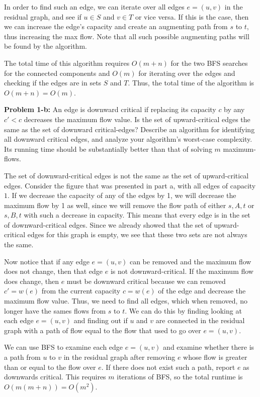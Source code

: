 \documentclass[psamsfonts]{amsart}
\newenvironment{sol}{\vspace{0.25cm}{\large \bfseries Solution:}}{\qedsymbol}
\newenvironment{prob}[1]{\begin{framed}{\large \bfseries Problem #1:}}{\end{framed}}
\begin{document}
\begin{sol}
In order to find such an edge, we can iterate over all edges $e = (u,v)$ in the residual graph, and see if $u \in S$ and $v \in T$ or vice versa. If this is the case, then we can increase the edge's capacity and create an augmenting path from $s$ to $t$, thus increasing the max flow. Note that all such possible augmenting paths will be found by the algorithm.

The total time of this algorithm requires $O(m+n)$ for the two BFS searches for the connected components and $O(m)$ for iterating over the edges and checking if the edges are in sets $S$ and $T$. Thus, the total time of the algorithm is $O(m+n) = O(m)$.
\end{sol}

\begin{prob}{1-b}
An edge is downward critical if replacing its capacity $c$ by any $c' < c$ decreases the maximum flow value. Is the set of upward-critical edges the same as the set of downward critical-edges? Describe an algorithm for identifying all downward critical edges, and analyze your algorithm's worst-case complexity. Its running time should be substantially better than that of solving $m$ maximum-flows.
\end{prob}
\begin{sol}
The set of downward-critical edges is not the same as the set of upward-critical edges. Consider the figure that was presented in part a, with all edges of capacity $1$. If we decrease the capacity of any of the edges by 1, we will decrease the maximum flow by 1 as well, since we will remove the flow path of either $s, A, t$ or $s,B,t$ with such a decrease in capacity. This means that every edge is in the set of downward-critical edges. Since we already showed that the set of upward-critical edges for this graph is empty, we see that these two sets are not always the same.

Now notice that if any edge $e = (u,v)$ can be removed and the maximum flow does not change, then that edge $e$ is not downward-critical. If the maximum flow does change, then $e$ must be downward critical because we can removed $c' = w(e)$ from the current capacity $c = w(e)$ of the edge and decrease the maximum flow value. Thus, we need to find all edges, which when removed, no longer have the sames flows from $s$ to $t$. We can do this by finding looking at each edge $e = (u,v)$ and finding out if $u$ and $v$ are connected in the residual graph with a path of flow equal to the flow that used to go over $e = (u,v)$. 

We can use BFS to examine each edge $e = (u,v)$ and examine whether there is a path from $u$ to $v$ in the residual graph after removing $e$ whose flow is greater than or equal to the flow over $e$. If there does not exist such a path, report $e$ as downwards critical. This requires $m$ iterations of BFS, so the total runtime is $O(m(m+n)) = O(m^2)$. 
\end{sol}
\end{document}

